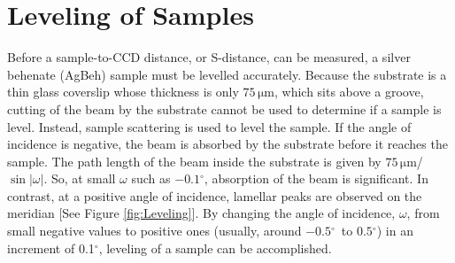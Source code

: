 \documentclass[letterpaper,12pt]{article}
\newcommand{\dg}{$^{\circ}$}%
\begin{document}
\section{Leveling of Samples}
Before a sample-to-CCD distance, or S-distance, can be measured, a silver behenate (AgBeh) sample must be levelled accurately. Because the substrate is a thin glass coverslip whose thickness is only $75\,\mathrm{\mu m}$, which sits above a groove, cutting of the beam by the substrate cannot be used to determine if a sample is level. Instead, sample scattering is used to level the sample. If the angle of incidence is negative, the beam is absorbed by the substrate before it reaches the sample. The path length of the beam inside the substrate is given by $75\,\mathrm{\mu m}$/$\sin |\omega|$. So, at small $\omega$ such as $-0.1$\dg, absorption of the beam is significant. In contrast, at a positive angle of incidence, lamellar peaks are observed on the meridian [See Figure \ref{fig:Leveling}]. By changing the angle of incidence, $\omega$, from small negative values to positive ones (usually, around $-0.5$\dg\ to $0.5$\dg) in an increment of 0.1\dg, leveling of a sample can be accomplished. 
\end{document}
